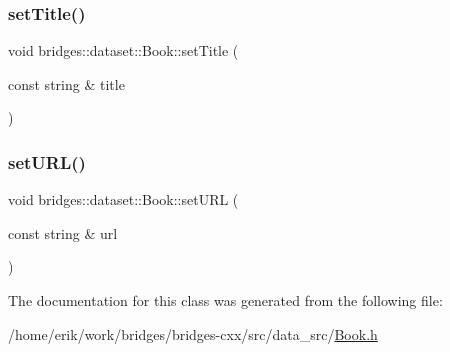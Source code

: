 \mbox{\label{classbridges_1_1dataset_1_1_book_a19015494ad6a1d9c75a5c6af63be0dbf}} 
\subsubsection{\texorpdfstring{set\+Title()}{setTitle()}}
{\footnotesize\ttfamily void bridges\+::dataset\+::\+Book\+::set\+Title (\begin{DoxyParamCaption}\item[{const string \&}]{title }\end{DoxyParamCaption})\hspace{0.3cm}{\ttfamily [inline]}}

\mbox{\label{classbridges_1_1dataset_1_1_book_a4d984e8854164f18944198293759319e}} 
\subsubsection{\texorpdfstring{set\+U\+R\+L()}{setURL()}}
{\footnotesize\ttfamily void bridges\+::dataset\+::\+Book\+::set\+U\+RL (\begin{DoxyParamCaption}\item[{const string \&}]{url }\end{DoxyParamCaption})\hspace{0.3cm}{\ttfamily [inline]}}



The documentation for this class was generated from the following file\+:\begin{DoxyCompactItemize}
\item 
/home/erik/work/bridges/bridges-\/cxx/src/data\+\_\+src/\hyperlink{_book_8h}{Book.\+h}\end{DoxyCompactItemize}
